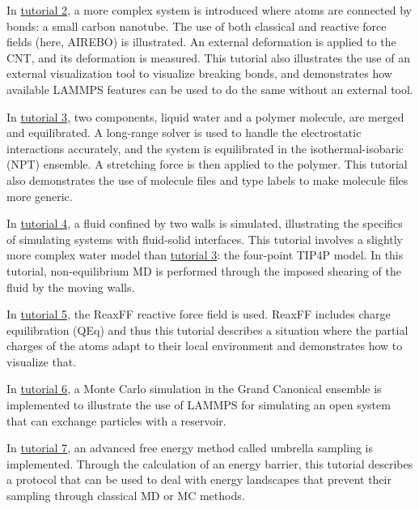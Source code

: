 \documentclass[9pt,tutorial]{livecoms}
\begin{document}
In \hyperref[carbon-nanotube-label]{tutorial 2}, a more complex system
is introduced where atoms are connected by bonds: a small carbon
nanotube. The use of both classical and reactive force fields (here,
AIREBO) is illustrated.  An external deformation is applied to the CNT,
and its deformation is measured.  This tutorial also illustrates the use
of an external visualization tool to visualize breaking bonds, and
demonstrates how available LAMMPS features can be used to do the same
without an external tool.

In \hyperref[all-atoms-label]{tutorial 3}, two components, liquid water
and a polymer molecule, are merged and equilibrated.  A long-range
solver is used to handle the electrostatic interactions accurately, and
the system is equilibrated in the isothermal-isobaric (NPT) ensemble. A
stretching force is then applied to the polymer.  This tutorial also
demonstrates the use of molecule files and type labels
\cite{typelabel_paper} to make molecule files more generic.

In \hyperref[sheared-confined-label]{tutorial 4}, a fluid confined by
two walls is simulated, illustrating the specifics of simulating systems
with fluid-solid interfaces.  This tutorial involves a slightly more
complex water model than \hyperref[all-atoms-label]{tutorial 3}: the
four-point TIP4P model.  In this tutorial, non-equilibrium MD is
performed through the imposed shearing of the fluid by the moving walls.

In \hyperref[reactive-silicon-dioxide-label]{tutorial 5}, the ReaxFF
reactive force field is used.  ReaxFF includes charge equilibration
(QEq) and thus this tutorial describes a situation where the partial
charges of the atoms adapt to their local environment and demonstrates
how to visualize that.

In \hyperref[gcmc-silica-label]{tutorial 6}, a Monte Carlo simulation in
the Grand Canonical ensemble is implemented to illustrate the use of
LAMMPS for simulating an open system that can exchange particles with a
reservoir.

In \hyperref[umbrella-sampling-label]{tutorial 7}, an advanced free
energy method called umbrella sampling is implemented.  Through the
calculation of an energy barrier, this tutorial describes a protocol
that can be used to deal with energy landscapes that prevent their
sampling through classical MD or MC methods.

\end{document}
